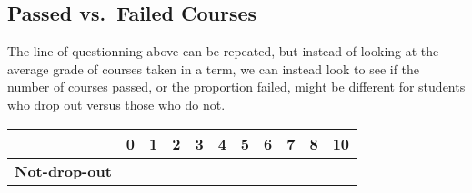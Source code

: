\documentclass[]{book}
\theoremstyle{definition}
\theoremstyle{definition}
\theoremstyle{remark}
\begin{document}
\subsection{Passed vs.~Failed Courses}\label{passed-vs.failed-courses}

The line of questionning above can be repeated, but instead of looking
at the average grade of courses taken in a term, we can instead look to
see if the number of courses passed, or the proportion failed, might be
different for students who drop out versus those who do not.

\begin{longtable}[]{@{}ccccccccccc@{}}
\toprule
\begin{minipage}[b]{0.19\columnwidth}\centering\strut
~\strut
\end{minipage} & \begin{minipage}[b]{0.06\columnwidth}\centering\strut
0\strut
\end{minipage} & \begin{minipage}[b]{0.05\columnwidth}\centering\strut
1\strut
\end{minipage} & \begin{minipage}[b]{0.04\columnwidth}\centering\strut
2\strut
\end{minipage} & \begin{minipage}[b]{0.04\columnwidth}\centering\strut
3\strut
\end{minipage} & \begin{minipage}[b]{0.04\columnwidth}\centering\strut
4\strut
\end{minipage} & \begin{minipage}[b]{0.04\columnwidth}\centering\strut
5\strut
\end{minipage} & \begin{minipage}[b]{0.04\columnwidth}\centering\strut
6\strut
\end{minipage} & \begin{minipage}[b]{0.04\columnwidth}\centering\strut
7\strut
\end{minipage} & \begin{minipage}[b]{0.04\columnwidth}\centering\strut
8\strut
\end{minipage} & \begin{minipage}[b]{0.04\columnwidth}\centering\strut
10\strut
\end{minipage}\tabularnewline
\midrule
\endhead
\begin{minipage}[t]{0.19\columnwidth}\centering\strut
\textbf{Not-drop-out}\strut
\end{minipage} & \begin{minipage}[t]{0.06\columnwidth}\centering\strut

\end{minipage}
\end{longtable}
\end{document}
